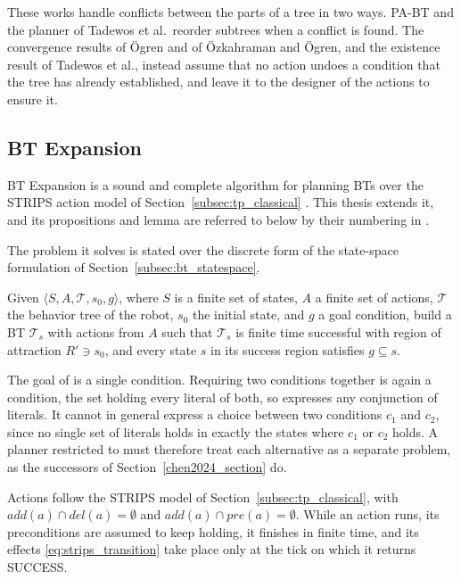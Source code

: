     These works handle conflicts between the parts of a tree in two ways.
    PA-BT and the planner of Tadewos et al.\ reorder subtrees when a conflict is found.
    The convergence results of Ögren and of Özkahraman and Ögren, and the existence result of Tadewos et al., instead assume that no action undoes a condition that the tree has already established, and leave it to the designer of the actions to ensure it.

    \subsection{BT Expansion}
    \label{subsec:bt_expansion}
    BT Expansion is a sound and complete algorithm for planning BTs over the STRIPS action model of Section~\ref{subsec:tp_classical} \cite{cai2021}.
    This thesis extends it, and its propositions and lemma are referred to below by their numbering in \cite{cai2021}.
    
    The problem it solves is stated over the discrete form of the state-space formulation of Section~\ref{subsec:bt_statespace}. %
    \begin{problem}
    \label{prob:one}
        Given $\langle S, A, \mathcal{T}, s_0, g \rangle$, where $S$ is a finite set of states, $A$ a finite set of actions, $\mathcal{T}$ the behavior tree of the robot, $s_0$ the initial state, and $g$ a goal condition, build a BT $\mathcal{T}_s$ with actions from $A$ such that $\mathcal{T}_s$ is finite time successful with region of attraction $R' \ni s_0$, and every state $s$ in its success region satisfies $g \subseteq s$.
    \end{problem}

    The goal of \probone is a single condition.
    Requiring two conditions together is again a condition, the set holding every literal of both, so \probone expresses any conjunction of literals.
    It cannot in general express a choice between two conditions $c_1$ and $c_2$, since no single set of literals holds in exactly the states where $c_1$ or $c_2$ holds.
    A planner restricted to \probone must therefore treat each alternative as a separate problem, as the successors of Section~\ref{chen2024_section} do.

    Actions follow the STRIPS model of Section~\ref{subsec:tp_classical}, with $add(a) \cap del(a) = \emptyset$ and $add(a) \cap pre(a) = \emptyset$.
    While an action runs, its preconditions are assumed to keep holding, it finishes in finite time, and its effects \eqref{eq:strips_transition} take place only at the tick on which it returns SUCCESS.


